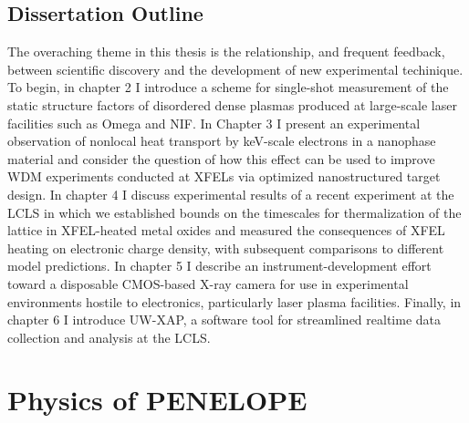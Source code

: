 \documentclass [11pt, proquest, article] {uwthesis}[2016/11/22]
\begin{document}
%





\section{Dissertation Outline}
The overaching theme in this thesis is the relationship, and frequent feedback, between scientific discovery and the development of new experimental techinique. To begin, in chapter 2 I introduce a scheme for single-shot measurement of the static structure factors of disordered dense plasmas produced at large-scale laser facilities such as Omega and NIF. In Chapter 3 I present an experimental observation of nonlocal heat transport by keV-scale electrons in a nanophase material and consider the question of how this effect can be used to improve WDM experiments conducted at XFELs via optimized nanostructured target design. In chapter 4 I discuss experimental results of a recent experiment at the LCLS in which we established bounds on the timescales for thermalization of the lattice in XFEL-heated metal oxides and measured the consequences of XFEL heating on electronic charge density, with subsequent comparisons to different model predictions.  In chapter 5 I describe an instrument-development effort toward a disposable CMOS-based X-ray camera for use in experimental environments hostile to electronics, particularly laser plasma facilities. Finally, in chapter 6 I introduce UW-XAP, a software tool for streamlined realtime data collection and analysis at the LCLS. 
 
\chapter{Physics of PENELOPE} %
\end{document}
